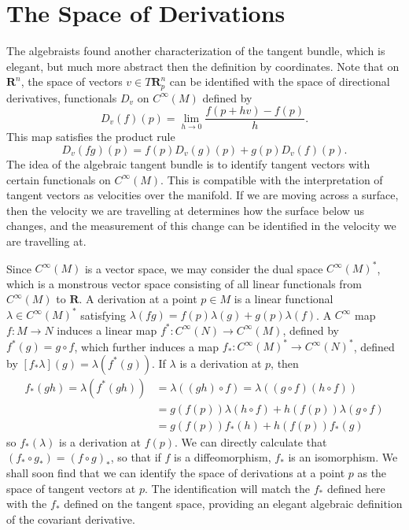 %
%

\section{The Space of Derivations}

The algebraists found another characterization of the tangent bundle, which is elegant, but much more abstract then the definition by coordinates. Note that on $\mathbf{R}^n$, the space of vectors $v \in T\mathbf{R}^n_p$ can be identified with the space of directional derivatives, functionals $D_v$ on $C^\infty(M)$ defined by
%
\[ D_v(f)(p) = \lim_{h \to 0} \frac{f(p + hv) - f(p)}{h}. \]
%
This map satisfies the product rule
%
\[ D_v(fg)(p) = f(p) D_v(g)(p) + g(p) D_v(f)(p). \]
%
The idea of the algebraic tangent bundle is to identify tangent vectors with certain functionals on $C^\infty(M)$. This is compatible with the interpretation of tangent vectors as velocities over the manifold. If we are moving across a surface, then the velocity we are travelling at determines how the surface below us changes, and the measurement of this change can be identified in the velocity we are travelling at.

Since $C^\infty(M)$ is a vector space, we may consider the dual space $C^\infty(M)^*$, which is a monstrous vector space consisting of all linear functionals from $C^\infty(M)$ to $\mathbf{R}$. A derivation at a point $p \in M$ is a linear functional $\lambda \in C^\infty(M)^*$ satisfying $\lambda(fg) = f(p) \lambda(g) + g(p) \lambda(f)$. A $C^\infty$ map $f: M \to N$ induces a linear map $f^*: C^\infty(N) \to C^\infty(M)$, defined by $f^*(g) = g \circ f$, which further induces a map $f_*: C^\infty(M)^* \to C^\infty(N)^*$, defined by $[f_*\lambda](g) = \lambda(f^*(g))$. If $\lambda$ is a derivation at $p$, then
%
\begin{align*}
    f_*(gh) = \lambda(f^*(gh)) &= \lambda((gh) \circ f) = \lambda((g \circ f)(h \circ f))\\
    &= g(f(p)) \lambda(h \circ f) + h(f(p)) \lambda(g \circ f)\\
    &= g(f(p)) f_*(h) + h(f(p)) f_*(g)
\end{align*}
%
so $f_*(\lambda)$ is a derivation at $f(p)$. We can directly calculate that $(f_* \circ g_*) = (f \circ g)_*$, so that if $f$ is a diffeomorphism, $f_*$ is an isomorphism. We shall soon find that we can identify the space of derivations at a point $p$ as the space of tangent vectors at $p$. The identification will match the $f_*$ defined here with the $f_*$ defined on the tangent space, providing an elegant algebraic definition of the covariant derivative.

